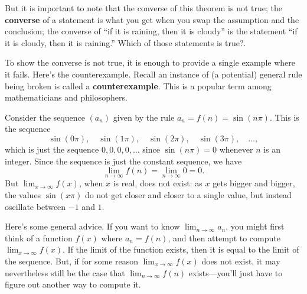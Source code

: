 \documentclass{ximera}
\newcommand{\defnword}[1]{\textbf{#1}}
\begin{document}
But it is important to note that the converse of this theorem is not
true; \label{sidenote:raining-converse}the \defnword{converse} of a
statement is what you get when you swap the assumption and the
conclusion; the converse of ``if it is raining, then it is cloudy'' is
the statement ``if it is cloudy, then it is raining.''  Which of those
statements is true?.

To show the converse is not true, it is enough to provide a single
example where it fails.  Here's the counterexample.  Recall an
instance of (a potential) general rule being broken is called a
\defnword{counterexample}.  This is a popular term among
mathematicians and philosophers.

\begin{example}
  Consider the sequence $(a_n)$ given by the rule $a_n = f(n)=\sin(n\pi)$.  This is the sequence
$$
  \sin(0\pi),\quad \sin(1\pi),\quad\sin(2\pi),\quad\sin(3\pi),\quad\ldots,
$$
which is just the sequence $0, 0, 0, 0, \ldots$ since $\sin(n\pi)=0$
whenever $n$ is an integer.  Since the sequence is just the constant sequence, we have
$$
\lim_{n\to\infty} f(n)= \lim_{n\to\infty} 0 = 0. 
$$But $\displaystyle\lim_{x\to\infty}f(x)$, when $x$ is real, does not exist: as $x$ gets
bigger and bigger, the values $\sin(x\pi)$ do not get closer and
closer to a single value, but instead oscillate between $-1$ and $1$.
\end{example} 

Here's some general advice. If you want to know $\displaystyle\lim_{n\to\infty}
a_n$, you might first think of a function $f(x)$ where $a_n = f(n)$,
and then attempt to compute $\displaystyle\lim_{x\to\infty}f(x)$.  If the limit
of the function exists, then it is equal to the limit of the sequence.
But, if for some reason $\displaystyle\lim_{x\to\infty}f(x)$ does not exist, it
may nevertheless still be the case that $\displaystyle\lim_{n\to\infty}f(n)$
exists---you'll just have to figure out another way to compute it.
\end{document}
